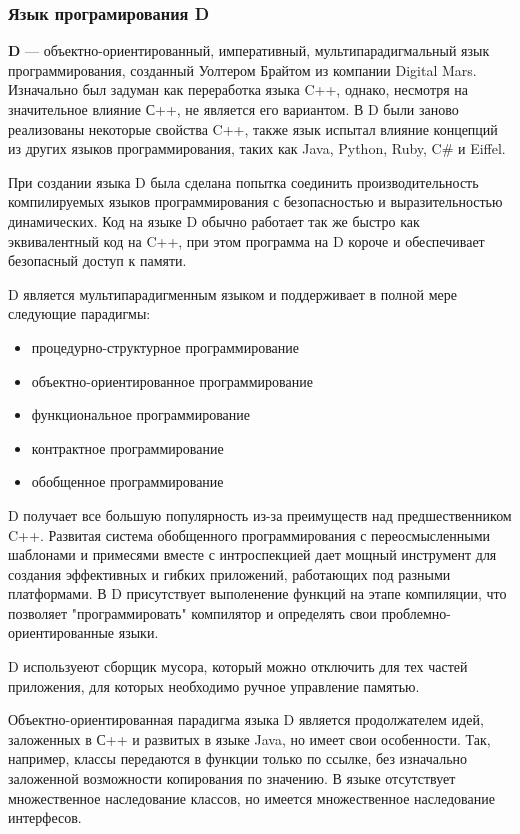 \documentclass[russian,utf8,emptystyle]{eskdtext}
\begin{document}
\begin{spacing}{1.5}
\subsubsection{Язык програмирования D}
\textbf{D} — объектно-ориентированный, императивный, мультипарадигмальный язык программирования, созданный Уолтером Брайтом из компании Digital Mars. Изначально был задуман как переработка языка C++, однако, несмотря на значительное влияние С++, не является его вариантом. В D были заново реализованы некоторые свойства C++, также язык испытал влияние концепций из других языков программирования, таких как Java, Python, Ruby, C\# и Eiffel.

При создании языка D была сделана попытка соединить производительность компилируемых языков программирования с безопасностью и выразительностью динамических. Код на языке D обычно работает так же быстро как эквивалентный код на C++, при этом программа на D короче и обеспечивает безопасный доступ к памяти.

D является мультипарадигменным языком и поддерживает в полной мере следующие парадигмы:
\begin{itemize}
\item процедурно-структурное программирование
\item объектно-ориентированное программирование
\item функциональное программирование
\item контрактное программирование
\item обобщенное программирование
\end{itemize}

D получает все большую популярность из-за преимуществ над предшественником C++. Развитая система обобщенного программирования с переосмысленными шаблонами и примесями вместе с интроспекцией дает мощный инструмент для создания эффективных и гибких приложений, работающих под разными платформами. В D присутствует выполенение функций на этапе компиляции, что позволяет "программировать" компилятор и определять свои проблемно-ориентированные языки.

D используеют сборщик мусора, который можно отключить для тех частей приложения, для которых необходимо ручное управление памятью. 

Объектно-ориентированная парадигма языка D является продолжателем идей, заложенных в С++ и развитых в языке Java, но имеет свои особенности. Так, например, классы передаются в функции только по ссылке, без изначально заложенной возможности копирования по значению. В языке отсутствует множественное наследование классов, но имеется множественное наследование интерфесов.


\end{spacing}
\end{document}
